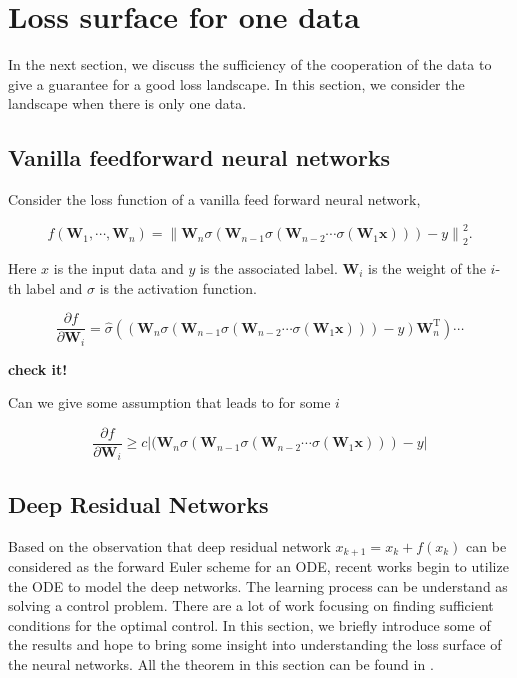 \documentclass{article}
\theoremstyle{plain}
\theoremstyle{definition}
\newcommand{\norm}[1]{\left\lVert#1\right\rVert}
\begin{document}
\section{Loss surface for one data}

In the next section, we discuss the sufficiency of the cooperation of the data to give a guarantee for a good loss landscape. In this section, we consider the landscape when there is only one data.


\subsection{Vanilla feedforward neural networks}
Consider the loss function of a vanilla feed forward neural network,

$$f(\mathbf W_1,\cdots,\mathbf W_n)=\norm{\mathbf W_n\sigma (\mathbf W_{n-1}\sigma(\mathbf W_{n-2}\cdots\sigma(\mathbf W_1\mathbf x)))-y}_2^2.$$

Here $x$ is the input data and $y$ is the associated label. $\mathbf W_i$ is the weight of the $i$-th label and $\sigma$ is the activation function.


$$
\frac{\partial f}{\partial \mathbf W_i}=\hat\sigma((\mathbf W_n\sigma (\mathbf W_{n-1}\sigma(\mathbf W_{n-2}\cdots\sigma(\mathbf W_1\mathbf x)))-y)\mathbf W_n^\mathrm{T})\cdots
$$

\textbf{check it!}

Can we give some assumption that leads to for some $i$

$$
\frac{\partial f}{\partial \mathbf W_i} \ge c|(\mathbf W_n\sigma (\mathbf W_{n-1}\sigma(\mathbf W_{n-2}\cdots\sigma(\mathbf W_1\mathbf x)))-y|
$$

\subsection{Deep Residual Networks}

Based on the observation that deep residual network $x_{k+1}=x_{k}+f(x_k)$ can be considered as the forward Euler scheme for an ODE, recent works begin to utilize the ODE to model the deep networks. The learning process can be understand as solving a control problem. There are a lot of work focusing on finding sufficient conditions for the optimal control. In this section, we briefly introduce some of the results and hope to bring some insight into understanding the loss surface of the neural networks. All the theorem in this section can be found in \cite{bressan2007introduction}.
\end{document}
